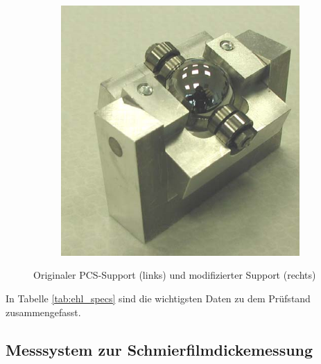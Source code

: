 \begin{figure}[htb]
\begin{subfigure}[b]{0.3\textwidth}
        \includegraphics[width=\textwidth]{./images/kugel-support_wittek.png}
    \end{subfigure}
    \caption{Originaler PCS-Support (links) und modifizierter Support (rechts) \cite{wittek_2007}}
    \label{fig:kugel_support}
\end{figure}
%

In Tabelle \ref{tab:ehl_specs} sind die wichtigsten Daten zu dem Prüfstand zusammengefasst.


\subsection{Messsystem zur Schmierfilmdickemessung}
\label{sub:messsystem_zur_schmierfilmdickemessung}

